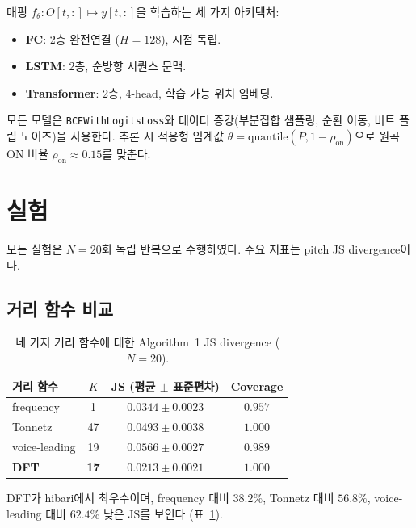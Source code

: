 \documentclass[11pt,a4paper]{article}
\begin{document}
매핑 $f_\theta : O[t,:] \mapsto y[t,:]$을 학습하는 세 가지
아키텍처:
\begin{itemize}
\item \textbf{FC}: 2층 완전연결 ($H = 128$), 시점 독립.
\item \textbf{LSTM}: 2층, 순방향 시퀀스 문맥.
\item \textbf{Transformer}: 2층, 4-head, 학습 가능 위치 임베딩.
\end{itemize}

모든 모델은 \texttt{BCEWithLogitsLoss}와 데이터 증강(부분집합 샘플링,
순환 이동, 비트 플립 노이즈)을 사용한다. 추론 시 적응형 임계값
$\theta = \mathrm{quantile}(P, 1-\rho_{\mathrm{on}})$으로
원곡 ON 비율 $\rho_{\mathrm{on}} \approx 0.15$를 맞춘다.


\section{실험}
\label{sec:experiments}

모든 실험은 $N = 20$회 독립 반복으로 수행하였다. 주요 지표는
pitch JS divergence이다.

\subsection{거리 함수 비교}
\label{subsec:dist_compare}

\begin{table}[H]
\centering
\caption{네 가지 거리 함수에 대한 Algorithm~1 JS divergence
($N = 20$).}
\label{tab:baselines}
\begin{tabular}{lccc}
\toprule
거리 함수 & $K$ & JS (평균 $\pm$ 표준편차) & Coverage \\
\midrule
frequency      & 1  & $0.0344 \pm 0.0023$ & $0.957$ \\
Tonnetz        & 47 & $0.0493 \pm 0.0038$ & $1.000$ \\
voice-leading  & 19 & $0.0566 \pm 0.0027$ & $0.989$ \\
\textbf{DFT}   & \textbf{17} & $\mathbf{0.0213 \pm 0.0021}$ & $1.000$ \\
\bottomrule
\end{tabular}
\end{table}

DFT가 hibari에서 최우수이며, frequency 대비 $38.2\%$,
Tonnetz 대비 $56.8\%$, voice-leading 대비 $62.4\%$ 낮은 JS를 보인다
(표~\ref{tab:baselines}).
\end{document}
